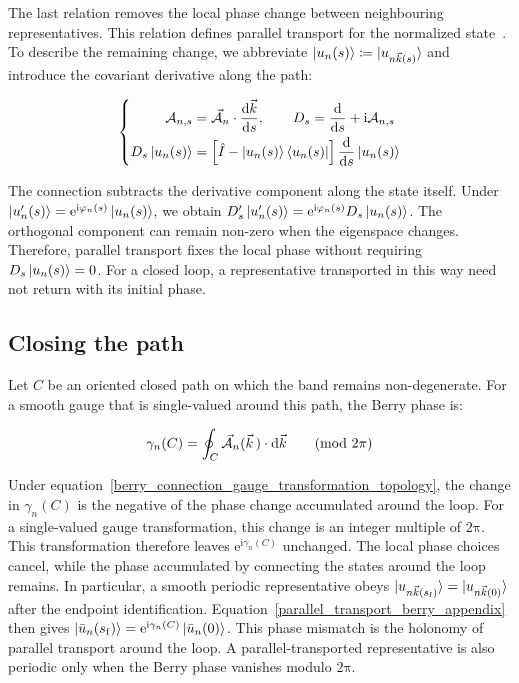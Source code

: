 The last relation removes the local phase change between neighbouring representatives.
This relation defines parallel transport for the normalized state~\cite{xiao2010berry}.
To describe the remaining change, we abbreviate $\ket{u_n(s)}\coloneqq\ket{u_{n\vec{k}(s)}}$
and introduce the covariant derivative along the path:

\begin{equation}
\left\{\begin{aligned}
    \mathcal{A}_{n,s}&=\vec{\mathcal{A}}_n\cdot\frac{\mathrm{d}\vec{k}}{\mathrm{d} s},
    \qquad D_s=\frac{\mathrm{d}}{\mathrm{d} s}+\mathrm{i}\mathcal{A}_{n,s} \\
    D_s\ket{u_n(s)}
    &=\left[\hat{I}-\ket{u_n(s)}\bra{u_n(s)}\right]
    \frac{\mathrm{d}}{\mathrm{d} s}\ket{u_n(s)}
\end{aligned}\right.
\label{covariant_state_derivative_appendix}
\end{equation}

The connection subtracts the derivative component along the state itself.
Under $\ket{u'_n(s)}=\mathrm{e}^{\mathrm{i}\varphi_n(s)}\ket{u_n(s)}$,
we obtain $D'_s\ket{u'_n(s)}=\mathrm{e}^{\mathrm{i}\varphi_n(s)}D_s\ket{u_n(s)}$.
The orthogonal component can remain non-zero when the eigenspace changes.
Therefore, parallel transport fixes the local phase without requiring $D_s\ket{u_n(s)}=0$.
For a closed loop, a representative transported in this way need not return with its initial phase.

\FloatBarrier
\subsection{Closing the path}

Let $C$ be an oriented closed path on which the band remains non-degenerate.
For a smooth gauge that is single-valued around this path, the Berry phase is:

\begin{equation}
    \gamma_n(C)
    =\oint_C\vec{\mathcal{A}}_n(\vec{k}\,)\cdot\mathrm{d}\vec{k}
    \qquad (\mathrm{mod}\ 2\mathrm{\pi})
\label{berry_phase_closed_path_topology}
\end{equation}

Under equation~\eqref{berry_connection_gauge_transformation_topology},
the change in $\gamma_n(C)$ is the negative of the phase change accumulated around the loop.
For a single-valued gauge transformation, this change is an integer multiple of $2\mathrm{\pi}$.
This transformation therefore leaves $\mathrm{e}^{\mathrm{i}\gamma_n(C)}$ unchanged.
The local phase choices cancel, while the phase accumulated by connecting the states around the loop remains.
In particular, a smooth periodic representative obeys
$\ket{u_{n\vec{k}(s_\mathrm{f})}}=\ket{u_{n\vec{k}(0)}}$ after the endpoint identification.
Equation~\eqref{parallel_transport_berry_appendix} then gives
$\ket{\bar{u}_n(s_\mathrm{f})}=\mathrm{e}^{\mathrm{i}\gamma_n(C)}\ket{\bar{u}_n(0)}$.
This phase mismatch is the holonomy of parallel transport around the loop.
A parallel-transported representative is also periodic only when the Berry phase vanishes modulo $2\mathrm{\pi}$.

